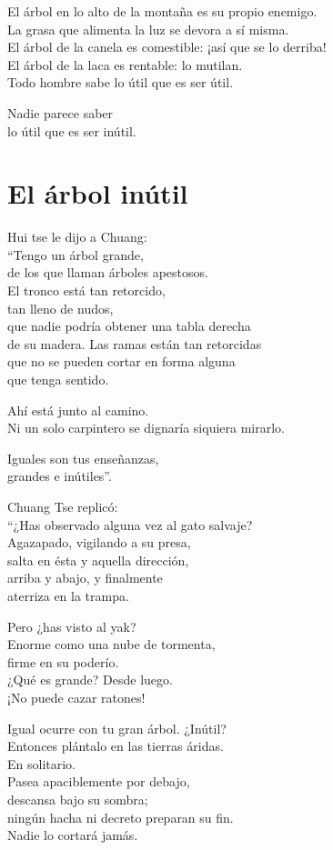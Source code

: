 \documentclass[hidelinks]{memoir}
\begin{document}
	El árbol en lo alto de la montaña es su propio enemigo.\\
	La grasa que alimenta la luz se devora a sí misma.\\
	El árbol de la canela es comestible: ¡así que se lo derriba!\\
	El árbol de la laca es rentable: lo mutilan.\\
	Todo hombre sabe lo útil que es ser útil.
	
	Nadie parece saber\\
	lo útil que es ser inútil.
	
	\chapter*{El árbol inútil}
	
	Hui tse le dijo a Chuang:\\
	``Tengo un árbol grande,\\
	de los que llaman árboles apestosos.\\
	El tronco está tan retorcido,\\
	tan lleno de nudos,\\
	que nadie podría obtener una tabla derecha\\
	de su madera. Las ramas están tan retorcidas\\
	que no se pueden cortar en forma alguna\\
	que tenga sentido.
	
	Ahí está junto al camino.\\
	Ni un solo carpintero se dignaría siquiera mirarlo.
	
	Iguales son tus enseñanzas,\\
	grandes e inútiles''.
	
	Chuang Tse replicó:\\
	``¿Has observado alguna vez al gato salvaje?\\
	Agazapado, vigilando a su presa,\\
	salta en ésta y aquella dirección,\\
	arriba y abajo, y finalmente\\
	aterriza en la trampa.
	
	Pero ¿has visto al yak?\\
	Enorme como una nube de tormenta,\\
	firme en su poderío.\\
	¿Qué es grande? Desde luego.\\
	¡No puede cazar ratones!
	
	Igual ocurre con tu gran árbol. ¿Inútil?\\
	Entonces plántalo en las tierras áridas.\\
	En solitario.\\
	Pasea apaciblemente por debajo,\\
	descansa bajo su sombra;\\
	ningún hacha ni decreto preparan su fin.\\
	Nadie lo cortará jamás.
	
\end{document}
